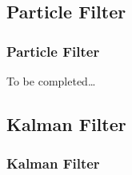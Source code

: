 \documentclass[letterpaper,10pt,english]{sphinxmanual}
\begin{document}
\subsection{Particle Filter}
\label{\detokenize{Filters:particle-filter}}
\sphinxstepscope


\subsubsection{Particle Filter}
\label{\detokenize{PF:particle-filter}}\label{\detokenize{PF::doc}}
\sphinxAtStartPar
To be completed…


\subsection{Kalman Filter}
\label{\detokenize{Filters:kalman-filter}}
\sphinxstepscope


\subsubsection{Kalman Filter}
\label{\detokenize{KF:kalman-filter}}\label{\detokenize{KF::doc}}
\begin{figure}[htbp]
\centering

\noindent{}
\end{figure}
\end{document}
